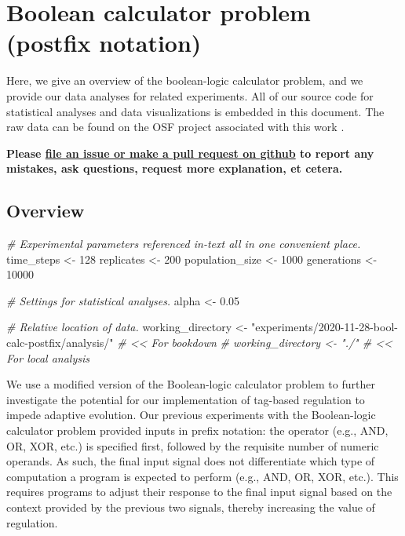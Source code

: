 \documentclass[
]{book}
\newenvironment{Shaded}{\begin{snugshade}}{\end{snugshade}}
\newcommand{\CommentTok}[1]{\textcolor[rgb]{0.56,0.35,0.01}{\textit{#1}}}
\newcommand{\DecValTok}[1]{\textcolor[rgb]{0.00,0.00,0.81}{#1}}
\newcommand{\FloatTok}[1]{\textcolor[rgb]{0.00,0.00,0.81}{#1}}
\newcommand{\NormalTok}[1]{#1}
\newcommand{\StringTok}[1]{\textcolor[rgb]{0.31,0.60,0.02}{#1}}
\begin{document}
\hypertarget{boolean-calculator-problem-postfix-notation}{%
\chapter{Boolean calculator problem (postfix notation)}\label{boolean-calculator-problem-postfix-notation}}

Here, we give an overview of the boolean-logic calculator problem, and we provide our data analyses for related experiments.
All of our source code for statistical analyses and data visualizations is embedded in this document.
The raw data can be found on the OSF project associated with this work \citep{Lalejini_Moreno_Ofria_Data_2020}.

\textbf{Please \href{https://github.com/amlalejini/Tag-based-Genetic-Regulation-for-LinearGP/issues}{file an issue or make a pull request on github} to report any mistakes, ask questions, request more explanation, et cetera.}

\hypertarget{overview-4}{%
\section{Overview}\label{overview-4}}

\begin{Shaded}
\begin{Highlighting}[]
\CommentTok{\# Experimental parameters referenced in{-}text all in one convenient place.}
\NormalTok{time\_steps \textless{}{-}}\StringTok{ }\DecValTok{128}
\NormalTok{replicates \textless{}{-}}\StringTok{ }\DecValTok{200}
\NormalTok{population\_size \textless{}{-}}\StringTok{ }\DecValTok{1000}
\NormalTok{generations \textless{}{-}}\StringTok{ }\DecValTok{10000}

\CommentTok{\# Settings for statistical analyses.}
\NormalTok{alpha \textless{}{-}}\StringTok{ }\FloatTok{0.05}

\CommentTok{\# Relative location of data.}
\NormalTok{working\_directory \textless{}{-}}\StringTok{ "experiments/2020{-}11{-}28{-}bool{-}calc{-}postfix/analysis/"} \CommentTok{\# \textless{}\textless{} For bookdown}
\CommentTok{\# working\_directory \textless{}{-} "./"                                              \# \textless{}\textless{} For local analysis}
\end{Highlighting}
\end{Shaded}

We use a modified version of the Boolean-logic calculator problem to further investigate the potential for our implementation of tag-based regulation to impede adaptive evolution.
Our previous experiments with the Boolean-logic calculator problem provided inputs in prefix notation: the operator (e.g., AND, OR, XOR, etc.) is specified first, followed by the requisite number of numeric operands.
As such, the final input signal does not differentiate which type of computation a program is expected to perform (e.g., AND, OR, XOR, etc.).
This requires programs to adjust their response to the final input signal based on the context provided by the previous two signals, thereby increasing the value of regulation.
\end{document}
